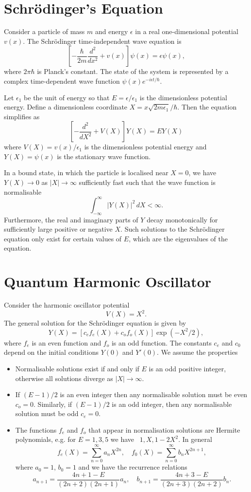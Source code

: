 \documentclass{article}
\begin{document}
\section{Schr\"odinger's Equation}

Consider a particle of mass \(m\) and energy \(\epsilon\) in a real one-dimensional potential \(v(x)\). The Schr\"odinger time-independent wave equation is
\[ \left[-\frac{\hbar}{2m}\frac{d^2}{dx^2} + v(x)\right]\psi(x) = \epsilon\psi(x), \]
where \(2\pi\hbar\) is Planck's constant. The state of the system is represented by a complex time-dependent wave function \(\psi(x)e^{-i\epsilon t/\hbar}\).

Let \(\epsilon_1\) be the unit of energy so that \(E = \epsilon/\epsilon_1\) is the dimensionless potential energy. Define a dimensionless coordinate \(X = x\sqrt{2m\epsilon_1}/\hbar\). Then the equation simplifies as
\[ \left[-\frac{d^2}{dX^2} + V(X)\right]Y(X) = EY(X) \]
where \(V(X) = v(x)/\epsilon_1\) is the dimensionless potential energy and \(Y(X) = \psi(x)\) is the stationary wave function. 

In a bound state, in which the particle is localised near \(X = 0\), we have \(Y(X) \to 0\) as \(|X| \to \infty\) sufficiently fast such that the wave function is normalisable
\[ \int_{-\infty}^{\infty} |Y(X)|^2 \,dX < \infty. \]
Furthermore, the real and imaginary parts of \(Y\) decay monotonically for sufficiently large positive or negative \(X\). Such solutions to the Schr\"odinger equation only exist for certain values of \(E\), which are the eigenvalues of the equation.

\section{Quantum Harmonic Oscillator}

Consider the harmonic oscillator potential
\[ V(X) = X^2. \]
The general solution for the Schr\"odinger equation is given by
\[ Y(X) = [c_ef_e(X) + c_of_o(X)]\exp(-X^2/2), \]
where \(f_e\) is an even function and \(f_o\) is an odd function. The constants \(c_e\) and \(c_0\) depend on the initial conditions \(Y(0)\) and \(Y'(0)\). We assume the properties
\begin{itemize}
    \item Normalisable solutions exist if and only if \(E\) is an odd positive integer, otherwise all solutions diverge as \(|X| \to \infty\).
    \item If \((E-1)/2\) is an even integer then any normalisable solution must be even \(c_o = 0\). Similarly, if \((E-1)/2\) is an odd integer, then any normalisable solution must be odd \(c_e = 0\).
    \item The functions \(f_e\) and \(f_o\) that appear in normalisation solutions are Hermite polynomials, e.g. for \(E = 1, 3, 5\) we have \ \(1, X, 1-2X^2\). In general
    \[ f_e(X) = \sum_{n=0}^\infty a_n X^{2n}, \quad f_0(X) = \sum_{n=0}^\infty b_n X^{2n+1}, \]
    where \(a_0 = 1\), \(b_0 = 1\) and we have the recurrence relations
    \[ a_{n+1} = \frac{4n+1-E}{(2n+2)(2n+1)}a_n, \quad b_{n+1} = \frac{4n+3-E}{(2n+3)(2n+2)}b_n. \]
\end{itemize}
\end{document}
